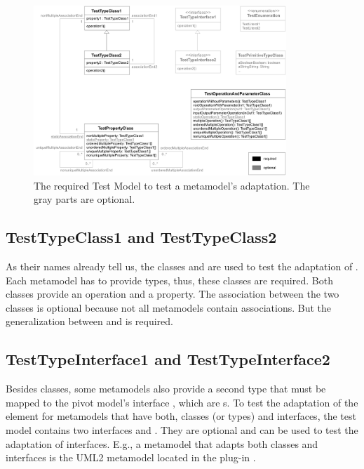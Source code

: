 \begin{figure}
	\includegraphics[width=0.85\textwidth]{figures/metamodeltestsuite/testModel.pdf}
	\caption{The required Test Model to test a metamodel's adaptation. The gray
	parts are optional.}
	\label{pic:metaModelTestsuite:testModel}
\end{figure}


\subsection{TestTypeClass1 and TestTypeClass2}

As their names already tell us, the classes  and 
 are used to test the adaptation of . Each 
metamodel has to provide types, thus, these classes are required. Both classes 
provide an operation and a property. The association between the two classes is 
optional because not all metamodels contain associations. But the
generalization between  and  is 
required.


\subsection{TestTypeInterface1 and TestTypeInterface2}

Besides classes, some metamodels also provide a second type that must be mapped
to the pivot model's interface , which are s. To test
the adaptation of the  element for metamodels that have both,
classes (or types) and interfaces, the test model contains two interfaces 
 and . They are optional and
can be used to test the adaptation of interfaces. E.g., a metamodel that adapts
both classes and interfaces is the \acs{UML}2 metamodel located in the plug-in 
.


